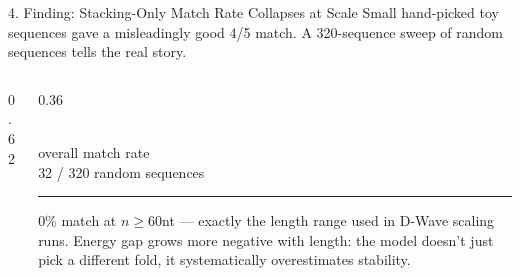 \documentclass[aspectratio=169,10pt]{beamer}
\begin{document}
\begin{frame}{4. Finding: Stacking-Only Match Rate Collapses at Scale}
  \small Small hand-picked toy sequences gave a misleadingly good 4/5 match. A 320-sequence sweep of random sequences tells the real story.
  \vspace{4pt}

  \begin{columns}[T]
    \begin{column}{0.62\textwidth}
      \begin{center}
      \end{center}
    \end{column}
    \begin{column}{0.36\textwidth}
      \begin{navybox}
      \\[4pt]
      {\small overall match rate\\ 32 / 320 random sequences}
      \vspace{6pt}\hrule\vspace{6pt}
      \footnotesize 0\% match at $n\geq60$nt --- exactly the length range used in D-Wave scaling runs. Energy gap grows more negative with length: the model doesn't just pick a different fold, it systematically overestimates stability.
      \end{navybox}
    \end{column}
  \end{columns}
\end{frame}
\end{document}
